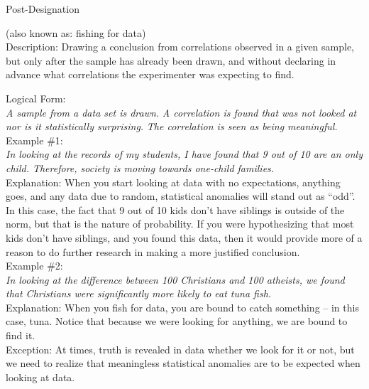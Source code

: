 \documentclass[a4paper,12pt,single,pdftex]{scrbook}
\begin{document}
    
  

Post-Designation
    
      (also known as: fishing for data)
    \\

  
    Description: Drawing a conclusion from correlations observed in a given sample, but only after the sample has already been drawn, and without declaring in advance what correlations the experimenter was expecting to find.

    
      Logical Form:
    \\

    
      {\em A sample from a data set is drawn.} \newline
{\em A correlation is found that was not looked at nor is it statistically surprising.} \newline
{\em The correlation is seen as being meaningful.}
    \\

    
      Example \#1:
    \\

    
      {\em In looking at the records of my students, I have found that 9 out of 10 are an only child.  Therefore, society is moving towards one-child families.}
    \\

    
      Explanation: When you start looking at data with no expectations, anything goes, and any data due to random, statistical anomalies will stand out as “odd”.  In this case, the fact that 9 out of 10 kids don’t have siblings is outside of the norm, but that is the nature of probability.  If you were hypothesizing that most kids don’t have siblings, and you found this data, then it would provide more of a reason to do further research in making a more justified conclusion. 
    \\

    
      Example \#2:
    \\

    
      {\em In looking at the difference between 100 Christians and 100 atheists, we found that Christians were significantly more likely to eat tuna fish.}
    \\

    
      Explanation: When you fish for data, you are bound to catch something -- in this case, tuna.  Notice that because we were looking for anything, we are bound to find it.
    \\

    
      Exception: At times, truth is revealed in data whether we look for it or not, but we need to realize that meaningless statistical anomalies are to be expected when looking at data.
    \\
\end{document}
